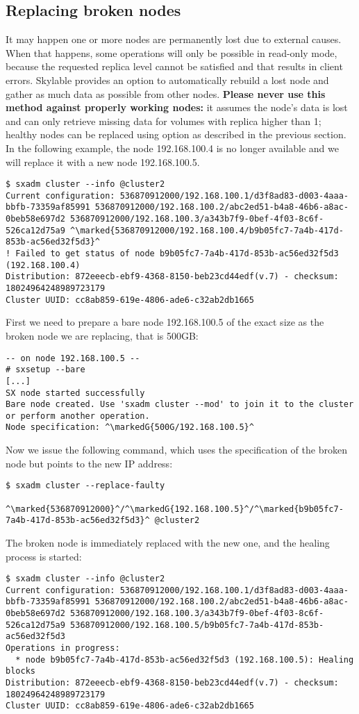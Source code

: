 \subsection{Replacing broken nodes}
It may happen one or more nodes are permanently lost due to external causes.
When that happens, some operations will only be possible in read-only mode,
because the requested replica level cannot be satisfied and that results in
client errors. Skylable \SX provides an option to automatically rebuild
a lost node and gather as much data as possible from other nodes.
\textbf{Please never use this method against properly working nodes:} it
assumes the node's data is lost and can only retrieve missing data for volumes
with replica higher than 1; healthy nodes can be replaced using 
option as described in the previous section. In the following example, the node
192.168.100.4 is no longer available and we will replace it with a new node
192.168.100.5.
\begin{lstlisting}
$ sxadm cluster --info @cluster2
Current configuration: 536870912000/192.168.100.1/d3f8ad83-d003-4aaa-bbfb-73359af85991 536870912000/192.168.100.2/abc2ed51-b4a8-46b6-a8ac-0beb58e697d2 536870912000/192.168.100.3/a343b7f9-0bef-4f03-8c6f-526ca12d75a9 ^\marked{536870912000/192.168.100.4/b9b05fc7-7a4b-417d-853b-ac56ed32f5d3}^
! Failed to get status of node b9b05fc7-7a4b-417d-853b-ac56ed32f5d3 (192.168.100.4)
Distribution: 872eeecb-ebf9-4368-8150-beb23cd44edf(v.7) - checksum: 18024964248989723179
Cluster UUID: cc8ab859-619e-4806-ade6-c32ab2db1665
\end{lstlisting}
First we need to prepare a bare node 192.168.100.5 of the exact size as the broken
node we are replacing, that is 500GB:
\begin{lstlisting}
-- on node 192.168.100.5 --
# sxsetup --bare
[...]
SX node started successfully
Bare node created. Use 'sxadm cluster --mod' to join it to the cluster
or perform another operation.
Node specification: ^\markedG{500G/192.168.100.5}^
\end{lstlisting}
Now we issue the following command, which uses the specification of the broken
node but points to the new IP address:
\begin{lstlisting}
$ sxadm cluster --replace-faulty
    ^\marked{536870912000}^/^\markedG{192.168.100.5}^/^\marked{b9b05fc7-7a4b-417d-853b-ac56ed32f5d3}^ @cluster2
\end{lstlisting}
The broken node is immediately replaced with the new one, and the healing process
is started:
\begin{lstlisting}
$ sxadm cluster --info @cluster2
Current configuration: 536870912000/192.168.100.1/d3f8ad83-d003-4aaa-bbfb-73359af85991 536870912000/192.168.100.2/abc2ed51-b4a8-46b6-a8ac-0beb58e697d2 536870912000/192.168.100.3/a343b7f9-0bef-4f03-8c6f-526ca12d75a9 536870912000/192.168.100.5/b9b05fc7-7a4b-417d-853b-ac56ed32f5d3
Operations in progress:
  * node b9b05fc7-7a4b-417d-853b-ac56ed32f5d3 (192.168.100.5): Healing blocks
Distribution: 872eeecb-ebf9-4368-8150-beb23cd44edf(v.7) - checksum: 18024964248989723179
Cluster UUID: cc8ab859-619e-4806-ade6-c32ab2db1665
\end{lstlisting}
